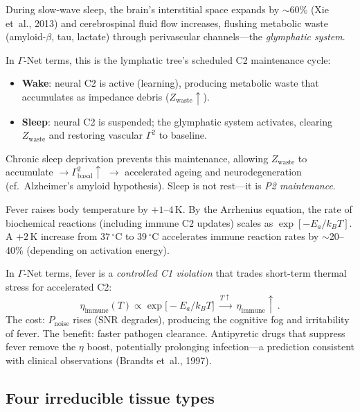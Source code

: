 \documentclass[aps,pre,twocolumn,superscriptaddress,floatfix]{revtex4-2}
\begin{document}
\begin{remark}
\label{rem:glymphatic-sleep}
During slow-wave sleep, the brain's interstitial
space expands by $\sim$60\% (Xie et~al., 2013)
and cerebrospinal fluid flow increases, flushing
metabolic waste (amyloid-$\beta$, tau, lactate)
through perivascular channels---the
\emph{glymphatic system}.

In $\Gamma$-Net terms, this is the lymphatic tree's
scheduled C2 maintenance cycle:
\begin{itemize}
  \item \textbf{Wake}: neural C2 is active
    (learning), producing metabolic waste that
    accumulates as impedance debris
    ($Z_{\text{waste}} \uparrow$).
  \item \textbf{Sleep}: neural C2 is suspended;
    the glymphatic system activates, clearing
    $Z_{\text{waste}}$ and restoring vascular
    $\Gamma^2$ to baseline.
\end{itemize}
Chronic sleep deprivation prevents this maintenance,
allowing $Z_{\text{waste}}$ to accumulate
$\to \Gamma^2_{\text{basal}} \uparrow$ $\to$
accelerated ageing and neurodegeneration
(cf.\ Alzheimer's amyloid hypothesis).
Sleep is not rest---it is \emph{P2 maintenance}.
\end{remark}

\begin{remark}
\label{rem:fever}
Fever raises body temperature by $+1$--$4$\,K.
By the Arrhenius equation, the rate of biochemical
reactions (including immune C2 updates)
scales as $\exp[-E_a / k_B T]$.
A $+2$\,K increase from $37\,^{\circ}$C to
$39\,^{\circ}$C accelerates immune reaction rates
by $\sim$20--40\% (depending on activation energy).

In $\Gamma$-Net terms, fever is a
\emph{controlled C1 violation} that trades
short-term thermal stress for accelerated C2:
\[
  \eta_{\text{immune}}(T) \propto
  \exp\!\bigl[-E_a / k_B T\bigr]
  \;\xrightarrow{T \uparrow}\;
  \eta_{\text{immune}} \uparrow\,.
\]
The cost: $P_{\text{noise}}$ rises (SNR degrades),
producing the cognitive fog and irritability of
fever.
The benefit: faster pathogen clearance.
Antipyretic drugs that suppress fever remove the
$\eta$ boost, potentially prolonging infection---a
prediction consistent with clinical observations
(Brandts et~al., 1997).
\end{remark}

\subsection{Four irreducible tissue types}
\label{sec:four-tissues}
\end{document}
